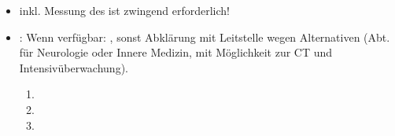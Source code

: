 \documentclass[
ngerman,
paper=a4,
asymmetric,
fontsize=10pt,
headings=small,
draft=false,
openany,
numbers=noenddot,
bibtotocnumbered,
footnotes=multiple,
toc=flat,
]{scrreprt}
\begin{document}
{\begin{itemize}
{  Senkung des Blutdrucks ist eine ärztliche Maßnahme.}
  \item {} inkl. Messung des  ist
  zwingend erforderlich!
  \item {}: Wenn verfügbar: , sonst
  Abklärung mit Leitstelle wegen Alternativen (Abt. für
  Neurologie oder Innere Medizin, mit Möglichkeit zur CT und
  Intensivüberwachung).
  \begin{enumerate}
    \item {}
    \item {}
    \item {}
  \end{enumerate}
\end{itemize}



\cite{Aass-1.0var1,AassMk-2013var1,MA70-Protokoll-2012-10-11,AsboeLvWien-2013-01-29,Lang2012,Ma70-Ausrueckordnung-2012-01-24}

}
{}
{}
{}
{}
\end{document}
